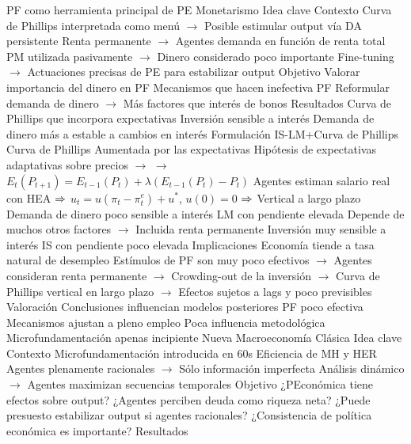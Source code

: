 \documentclass{nuevotema}
\begin{document}
\begin{esquemal}
				\4 PF como herramienta principal de PE
		\2 Monetarismo
			\3 Idea clave
				\4 Contexto
				\4[] Curva de Phillips interpretada como menú
				\4[] $\to$ Posible estimular output vía DA persistente
				\4[] Renta permanente
				\4[] $\to$ Agentes demanda en función de renta total
				\4[] PM utilizada pasivamente
				\4[] $\to$ Dinero considerado poco importante
				\4[] Fine-tuning
				\4[] $\to$ Actuaciones precisas de PE para estabilizar output
				\4 Objetivo
				\4[] Valorar importancia del dinero en PF
				\4[] Mecanismos que hacen inefectiva PF
				\4[] Reformular demanda de dinero
				\4[] $\to$ Más factores que interés de bonos
				\4 Resultados
				\4[] Curva de Phillips que incorpora expectativas
				\4[] Inversión sensible a interés
				\4[] Demanda de dinero más a estable a cambios en interés
			\3 Formulación
				\4 IS-LM+Curva de Phillips
				\4 Curva de Phillips
				\4[] Aumentada por las expectativas
				\4[] Hipótesis de expectativas adaptativas sobre precios
				\4[] $\to$ $\to$ $E_t(P_{t+1}) = E_{t-1}(P_t) + \lambda \left( E_{t-1}(P_t) - P_t \right)$
				\4[] Agentes estiman salario real con HEA
				\4[] $\Rightarrow$ $u_t = u(\pi_t - \pi_t^e) + u^*$, $u(0) = 0$
				\4[] $\Rightarrow$ Vertical a largo plazo
				\4 Demanda de dinero poco sensible a interés
				\4[] LM con pendiente elevada
				\4[] Depende de muchos otros factores
				\4[] $\to$ Incluida renta permanente
				\4 Inversión muy sensible a interés
				\4[] IS con pendiente poco elevada
			\3 Implicaciones
				\4 Economía tiende a tasa natural de desempleo
				\4 Estímulos de PF son muy poco efectivos
				\4[] $\to$ Agentes consideran renta permanente
				\4[] $\to$ Crowding-out de la inversión
				\4[] $\to$ Curva de Phillips vertical en largo plazo
				\4[] $\to$ Efectos sujetos a lags y poco previsibles
			\3 Valoración
				\4 Conclusiones influencian modelos posteriores
				\4[] PF poco efectiva
				\4[] Mecanismos ajustan a pleno empleo
				\4 Poca influencia metodológica
				\4[] Microfundamentación apenas incipiente
		\2 Nueva Macroeconomía Clásica
			\3 Idea clave
				\4 Contexto
				\4[] Microfundamentación introducida en 60s
				\4[] Eficiencia de MH y HER
				\4[] Agentes plenamente racionales
				\4[] $\to$ Sólo información imperfecta
				\4[] Análisis dinámico
				\4[] $\to$ Agentes maximizan secuencias temporales
				\4 Objetivo
				\4[] ¿PEconómica tiene efectos sobre output?
				\4[] ¿Agentes perciben deuda como riqueza neta?
				\4[] ¿Puede presuesto estabilizar output si agentes racionales?
				\4[] ¿Consistencia de política económica es importante?
				\4 Resultados

\end{esquemal}
\end{document}
